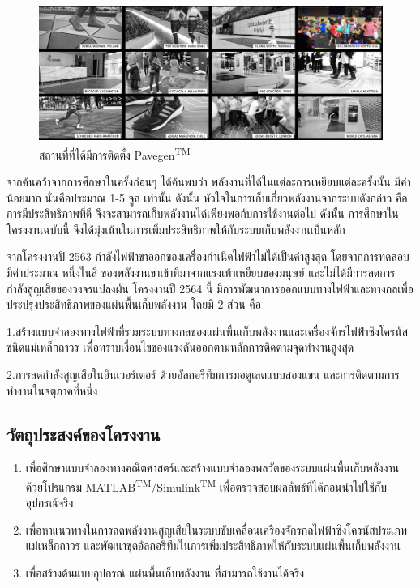 \documentclass[11pt,a4paper]{article}
\begin{document}
\begin{figure}
    \centering
    \includegraphics[width=\textwidth]{pavegen_usecase.png}
    \caption{สถานที่ที่ได้มีการติดตั้ง Pavegen\textsuperscript{TM}}
\end{figure}

จากค้นคว้าจากการศึกษาในครั้งก่อนๆ \cite{biomech} \cite{GpH:01} ได้ค้นพบว่า พลังงานที่ได้ในแต่ละการเหยียบแต่ละครั้งนั้น มีค่าน้อยมาก นั่นคือประมาณ 1-5 จูล เท่านั้น ดังนั้น หัวใจในการเก็บเกี่ยวพลังงานจากระบบดังกล่าว คือการมีประสิทธิภาพที่ดี จึงจะสามารถเก็บพลังงานได้เพียงพอกับการใช้งานต่อไป ดังนั้น การศึกษาในโครงงานฉบับนี้ จึงได้มุ่งเน้นในการเพิ่มประสิทธิภาพให้กับระบบเก็บพลังงานเป็นหลัก

จากโครงงานปี 2563 กำลังไฟฟ้าขาออกของเครื่องกำเนิดไฟฟ้าไม่ได้เป็นค่าสูงสุด โดยจากการทดสอบมีค่าประมาณ หนึ่งในสี่ ของพลังงานขาเข้าที่มาจากแรงเท้าเหยียบของมนุษย์ และไม่ได้มีการลดการกำลังสูญเสียของวงจรแปลงผัน โครงงานปี 2564 นี้ มีการพัฒนาการออกแบบทางไฟฟ้าและทางกลเพื่อประปรุงประสิทธิภาพของแผ่นพื้นเก็บพลังงาน โดยมี 2 ส่วน คือ

1.สร้างแบบจำลองทางไฟฟ้าที่รวมระบบทางกลของแผ่นพื้นเก็บพลังงานและเครื่องจักรไฟฟ้าซิงโครนัสชนิดแม่เหล็กถาวร เพื่อทราบเงื่อนไขของแรงดันออกตามหลักการติดตามจุดทำงานสูงสุด

2.การลดกำลังสูญเสียในอินเวอร์เตอร์ ด้วยอัลกอรึทึมการมอดูเลตแบบสองแขน และการติดตามการทำงานในจตุภาคที่หนึ่ง


\subsection{วัตถุประสงค์ของโครงงาน}
\begin{enumerate}
    \item เพื่อศึกษาแบบจำลองทางคณิตศาสตร์และสร้างแบบจำลองพลวัตของระบบแผ่นพื้นเก็บพลังงานด้วยโปรแกรม MATLAB\textsuperscript{TM}/Simulink\textsuperscript{TM} เพื่อตรวจสอบผลลัพธ์ที่ได้ก่อนนำไปใช้กับอุปกรณ์จริง
    \item เพื่อหาแนวทางในการลดพลังงานสูญเสียในระบบขับเคลื่อนเครื่องจักรกลไฟฟ้าซิงโครนัสประเภทแม่เหล็กถาวร และพัฒนาชุดอัลกอริทึมในการเพิ่มประสิทธิภาพให้กับระบบแผ่นพื้นเก็บพลังงาน
    \item เพื่อสร้างต้นแบบอุปกรณ์ แผ่นพื้นเก็บพลังงาน ที่สามารถใช้งานได้จริง

\end{enumerate}
\end{document}
